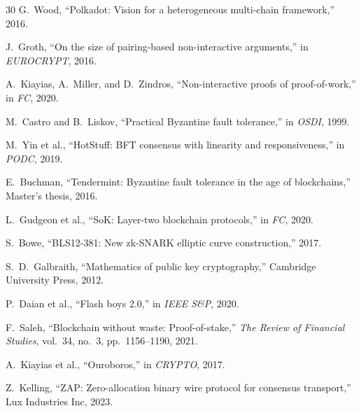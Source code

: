 \begin{thebibliography}{30}
G.~Wood, ``Polkadot: Vision for a heterogeneous multi-chain framework,'' 2016.

J.~Groth, ``On the size of pairing-based non-interactive arguments,'' in \emph{EUROCRYPT}, 2016.

A.~Kiayias, A.~Miller, and D.~Zindros, ``Non-interactive proofs of proof-of-work,'' in \emph{FC}, 2020.

M.~Castro and B.~Liskov, ``Practical Byzantine fault tolerance,'' in \emph{OSDI}, 1999.

M.~Yin et al., ``HotStuff: BFT consensus with linearity and responsiveness,'' in \emph{PODC}, 2019.

E.~Buchman, ``Tendermint: Byzantine fault tolerance in the age of blockchains,'' Master's thesis, 2016.

L.~Gudgeon et al., ``SoK: Layer-two blockchain protocols,'' in \emph{FC}, 2020.

S.~Bowe, ``BLS12-381: New zk-SNARK elliptic curve construction,'' 2017.

S.~D.~Galbraith, ``Mathematics of public key cryptography,'' Cambridge University Press, 2012.

P.~Daian et al., ``Flash boys 2.0,'' in \emph{IEEE S\&P}, 2020.

F.~Saleh, ``Blockchain without waste: Proof-of-stake,'' \emph{The Review of Financial Studies}, vol.~34, no.~3, pp.~1156--1190, 2021.

A.~Kiayias et al., ``Ouroboros,'' in \emph{CRYPTO}, 2017.

Z.~Kelling, ``ZAP: Zero-allocation binary wire protocol for consensus transport,'' Lux Industries Inc, 2023.

\end{thebibliography}

